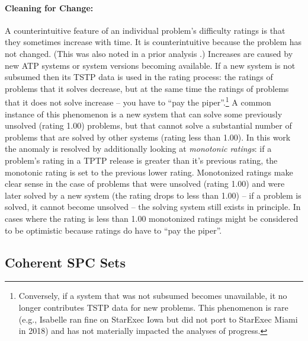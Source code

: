 \documentclass[runningheads]{llncs}
\begin{document}
\paragraph{Cleaning for Change:}
A counterintuitive feature of an individual problem's difficulty ratings is that they sometimes 
increase with time. 
It is counterintuitive because the problem has not changed.
(This was also noted in a prior analysis \cite{Sut17}.)
Increases are caused by new ATP systems or system versions becoming available.
If a new system is not subsumed then its TSTP data is used in the rating process:
the ratings of problems that it solves decrease, but at the same time the ratings of problems that 
it does not solve increase -- you have to ``pay the piper''.\footnote{%
Conversely, if a system that was not subsumed becomes unavailable, it no longer contributes
TSTP data for new problems.
This phenomenon is rare (e.g., Isabelle ran fine on StarExec Iowa but did not port to StarExec 
Miami in 2018) and has not materially impacted the analyses of progress.} 
A common instance of this phenomenon is a new system that can solve some previously unsolved
(rating 1.00) problems, but that cannot solve a substantial number of problems that are solved
by other systems (rating less than 1.00).
In this work the anomaly is resolved by additionally looking at {\em monotonic ratings}:
if a problem's rating in a TPTP release is greater than it's previous rating, the monotonic 
rating is set to the previous lower rating.
Monotonized ratings make clear sense in the case of problems that were unsolved (rating 1.00) and 
were later solved by a new system (the rating drops to less than 1.00) -- if a problem is 
solved, it cannot become unsolved -- the solving system still exists in principle.
In cases where the rating is less than 1.00 monotonized ratings might be considered to be 
optimistic because ratings do have to ``pay the piper''.

\subsection{Coherent SPC Sets}
\label{SPCSets}
\end{document}
